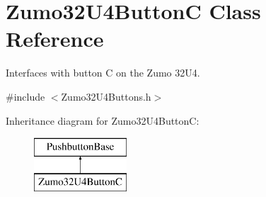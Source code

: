 \hypertarget{class_zumo32_u4_button_c}{}\section{Zumo32\+U4\+ButtonC Class Reference}
\label{class_zumo32_u4_button_c}


Interfaces with button C on the Zumo 32\+U4.  




{\ttfamily \#include $<$Zumo32\+U4\+Buttons.\+h$>$}

Inheritance diagram for Zumo32\+U4\+ButtonC\+:\begin{figure}[H]
\begin{center}
\leavevmode
\includegraphics[height=2.000000cm]{class_zumo32_u4_button_c}
\end{center}
\end{figure}
